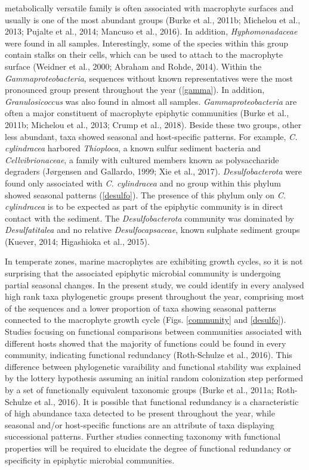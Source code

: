 \documentclass[12pt,]{article}
\begin{document}
metabolically versatile family is often associated with macrophyte
surfaces and usually is one of the most abundant groups (Burke et al.,
2011b; Michelou et al., 2013; Pujalte et al., 2014; Mancuso et al.,
2016). In addition, \emph{Hyphomonadaceae} were found in all samples.
Interestingly, some of the species within this group contain stalks on
their cells, which can be used to attach to the macrophyte surface
(Weidner et al., 2000; Abraham and Rohde, 2014). Within the
\emph{Gammaproteobacteria}, sequences without known representatives were
the most pronounced group present throughout the year (\autoref{gamma}).
In addition, \emph{Granulosicoccus} was also found in almost all
samples. \emph{Gammaproteobacteria} are often a major constituent of
macrophyte epiphytic communities (Burke et al., 2011b; Michelou et al.,
2013; Crump et al., 2018). Beside these two groups, other less abundant,
taxa showed seasonal and host-specific patterns. For example, \emph{C.
cylindracea} harbored \emph{Thioploca}, a known sulfur sediment bacteria
and \emph{Cellvibrionaceae}, a family with cultured members known as
polysaccharide degraders (Jørgensen and Gallardo, 1999; Xie et al.,
2017). \emph{Desulfobacterota} were found only associated with \emph{C.
cylindracea} and no group within this phylum showed seasonal patterns
(\autoref{desulfo}). The presence of this phylum only on \emph{C.
cylindracea} is to be expected as part of the epiphytic community is in
direct contact with the sediment. The \emph{Desulfobacterota} community
was dominated by \emph{Desulfatitalea} and no relative
\emph{Desulfocapsaceae}, known sulphate sediment groups (Kuever, 2014;
Higashioka et al., 2015).

In temperate zones, marine macrophytes are exhibiting growth cycles, so
it is not surprising that the associated epiphytic microbial community
is undergoing partial seasonal changes. In the present study, we could
identify in every analysed high rank taxa phylogenetic groups present
throughout the year, comprising most of the sequences and a lower
proportion of taxa showing seasonal patterns connected to the macrophyte
growth cycle (Figs. \ref{community} and \ref{desulfo}). Studies focusing
on functional comparisons between communities associated with different
hosts showed that the majority of functions could be found in every
community, indicating functional redundancy (Roth-Schulze et al., 2016).
This difference between phylogenetic varaibility and functional
stability was explained by the lottery hypothesis assuming an initial
random colonization step performed by a set of functionally equivalent
taxonomic groups (Burke et al., 2011a; Roth-Schulze et al., 2016). It is
possible that functional redundancy is a characteristic of high
abundance taxa detected to be present throughout the year, while
seasonal and/or host-specific functions are an attribute of taxa
displaying successional patterns. Further studies connecting taxonomy
with functional properties will be required to elucidate the degree of
functional redundancy or specificity in epiphytic microbial communities.
\end{document}

